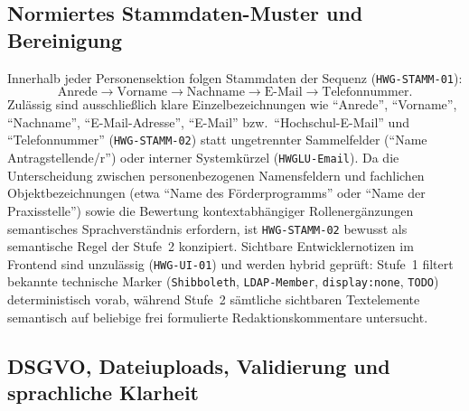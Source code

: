 \subsection{Normiertes Stammdaten-Muster und Bereinigung}
\label{subsec:stammdaten_muster}

Innerhalb jeder Personensektion folgen Stammdaten der Sequenz (\texttt{HWG-STAMM-01}):
\begin{equation}
    \text{Anrede} \longrightarrow \text{Vorname} \longrightarrow \text{Nachname} \longrightarrow \text{E-Mail} \longrightarrow \text{Telefonnummer}.
\end{equation}
Zulässig sind ausschließlich klare Einzelbezeichnungen wie \enquote{Anrede}, \enquote{Vorname}, \enquote{Nachname}, \enquote{E-Mail-Adresse}, \enquote{E-Mail} bzw.\ \enquote{Hochschul-E-Mail} und \enquote{Telefonnummer} (\texttt{HWG-STAMM-02}) statt ungetrennter Sammelfelder (\enquote{Name Antragstellende/r}) oder interner Systemkürzel (\texttt{HWGLU-Email}). Da die Unterscheidung zwischen personenbezogenen Namensfeldern und fachlichen Objektbezeichnungen (etwa \enquote{Name des Förderprogramms} oder \enquote{Name der Praxisstelle}) sowie die Bewertung kontextabhängiger Rollenergänzungen semantisches Sprachverständnis erfordern, ist \texttt{HWG-STAMM-02} bewusst als semantische Regel der Stufe~2 konzipiert. Sichtbare Entwicklernotizen im Frontend sind unzulässig (\texttt{HWG-UI-01}) und werden hybrid geprüft: Stufe~1 filtert bekannte technische Marker (\texttt{Shibboleth}, \texttt{LDAP-Member}, \texttt{display:none}, \texttt{TODO}) deterministisch vorab, während Stufe~2 sämtliche sichtbaren Textelemente semantisch auf beliebige frei formulierte Redaktionskommentare untersucht.

\subsection{DSGVO, Dateiuploads, Validierung und sprachliche Klarheit}
\label{subsec:validierung_microcopy}

